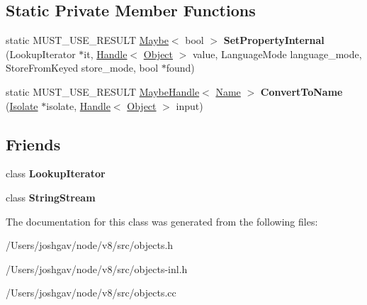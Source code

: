 \subsection*{Static Private Member Functions}
\begin{DoxyCompactItemize}
\item 
static M\+U\+S\+T\+\_\+\+U\+S\+E\+\_\+\+R\+E\+S\+U\+LT \hyperlink{classv8_1_1_maybe}{Maybe}$<$ bool $>$ {\bfseries Set\+Property\+Internal} (Lookup\+Iterator $\ast$it, \hyperlink{classv8_1_1internal_1_1_handle}{Handle}$<$ \hyperlink{classv8_1_1internal_1_1_object}{Object} $>$ value, Language\+Mode language\+\_\+mode, Store\+From\+Keyed store\+\_\+mode, bool $\ast$found)\hypertarget{classv8_1_1internal_1_1_object_af4ffe04f8a250edff5d2661df7c80a52}{}\label{classv8_1_1internal_1_1_object_af4ffe04f8a250edff5d2661df7c80a52}

\item 
static M\+U\+S\+T\+\_\+\+U\+S\+E\+\_\+\+R\+E\+S\+U\+LT \hyperlink{classv8_1_1internal_1_1_maybe_handle}{Maybe\+Handle}$<$ \hyperlink{classv8_1_1internal_1_1_name}{Name} $>$ {\bfseries Convert\+To\+Name} (\hyperlink{classv8_1_1internal_1_1_isolate}{Isolate} $\ast$isolate, \hyperlink{classv8_1_1internal_1_1_handle}{Handle}$<$ \hyperlink{classv8_1_1internal_1_1_object}{Object} $>$ input)\hypertarget{classv8_1_1internal_1_1_object_a8f442de0faf63ad9031c5c38004a9702}{}\label{classv8_1_1internal_1_1_object_a8f442de0faf63ad9031c5c38004a9702}

\end{DoxyCompactItemize}
\subsection*{Friends}
\begin{DoxyCompactItemize}
\item 
class {\bfseries Lookup\+Iterator}\hypertarget{classv8_1_1internal_1_1_object_a44f614b48d67bab95d53634a26593e69}{}\label{classv8_1_1internal_1_1_object_a44f614b48d67bab95d53634a26593e69}

\item 
class {\bfseries String\+Stream}\hypertarget{classv8_1_1internal_1_1_object_a1e02d3fa3aed0e038625842888f70c2a}{}\label{classv8_1_1internal_1_1_object_a1e02d3fa3aed0e038625842888f70c2a}

\end{DoxyCompactItemize}


The documentation for this class was generated from the following files\+:\begin{DoxyCompactItemize}
\item 
/\+Users/joshgav/node/v8/src/objects.\+h\item 
/\+Users/joshgav/node/v8/src/objects-\/inl.\+h\item 
/\+Users/joshgav/node/v8/src/objects.\+cc\end{DoxyCompactItemize}
